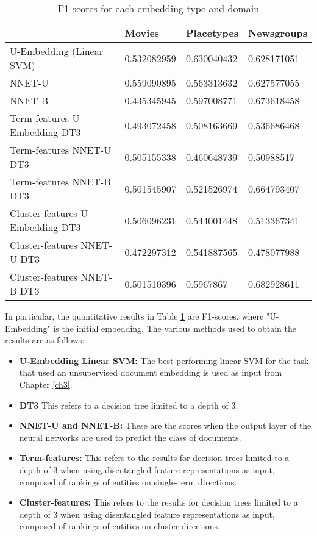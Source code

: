 \begin{table}[]
\begin{tabular}{llll}
	& \textbf{Movies}      & \textbf{Placetypes}  & \textbf{Newsgroups}  \\
	\toprule
	U-Embedding (Linear SVM)   & 0.532082959 & 0.630040432 & 0.628171051 \\
	NNET-U                      & 0.559090895 & 0.563313632 & 0.627577055 \\
	NNET-B                      & 0.435345945 & 0.597008771 & 0.673618458 \\
	Term-features U-Embedding DT3 & 0.493072458 & 0.508163669 & 0.536686468 \\
	Term-features NNET-U DT3       & 0.505155338 & 0.460648739 & 0.50988517  \\
	Term-features NNET-B DT3       & 0.501545907 & 0.521526974 & 0.664793407 \\
	Cluster-features U-Embedding DT3   & 0.506096231 & 0.544001448 & 0.513367341 \\
	Cluster-features NNET-U DT3         & 0.472297312 & 0.541887565 & 0.478077988 \\
	Cluster-features NNET-B DT3         & 0.501510396 & 0.5967867   & 0.682928611
\end{tabular}\caption{F1-scores for each embedding type and domain}\label{ch5:quantresults}
\end{table}

In particular, the quantitative results in Table \ref{ch5:quantresults} are F1-scores, where "U-Embedding" is the initial embedding. The various methods used to obtain the results are as follows:

\begin{itemize}
	\item \textbf{U-Embedding Linear SVM:} The best performing linear SVM for the task that used an unsupervised document embedding is used as input  from Chapter \ref{ch3}.
	\item \textbf{DT3} This refers to a decision tree limited to a depth of 3.
	\item \textbf{NNET-U and NNET-B:} These are the scores when the output layer of the neural networks are used to predict the class of documents. 
	\item \textbf{Term-features:} This refers to the results for decision trees limited to a depth of 3 when using  disentangled feature representations as input, composed of rankings of entities on single-term directions.
	\item \textbf{Cluster-features:} This refers to the results for decision trees limited to a depth of 3 when using  disentangled feature representations as input, composed of rankings of entities on cluster directions.
\end{itemize}

